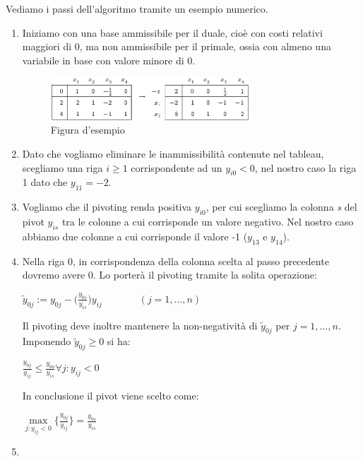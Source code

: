 \documentclass[11pt]{book}
\begin{document}
Vediamo i passi dell'algoritmo tramite un esempio numerico.

\begin{enumerate}
\item Iniziamo con una base ammissibile per il duale, cio\`e con costi
  relativi maggiori di 0, ma non ammissibile per il primale, ossia con
  almeno una variabile in base con valore minore di 0.

\begin{figure}[h!]
  \centering
  \includegraphics[width=0.7\textwidth]{images/cap5tab3.png}
  \caption{Figura d'esempio}
  \label{cap5tab3}
\end{figure}

\item Dato che vogliamo eliminare le inammissibilit\`a contenute nel
  tableau, scegliamo una riga $i \geq 1$ corrispondente ad un $y_{i0}
  < 0$, nel nostro caso la riga 1 dato che $y_{11} = -2$. 

\item Vogliamo che il pivoting renda positiva $y_{i0}$, per cui
  scegliamo la colonna {\em s} del pivot $y_{is}$ tra le colonne a cui
  corrisponde un valore negativo. Nel nostro caso abbiamo due colonne
  a cui corrisponde il valore -1 ($y_{13}$ e $y_{14}$).

\item Nella riga 0, in corrispondenza della colonna scelta al passo
  precedente dovremo avere 0. Lo porter\`a il pivoting tramite
  la solita operazione:

  \begin{center}
    $\tilde{y}_{0j} := y_{0j} -
    \bigr(\frac{y_{0s}}{y_{is}}\bigr)y_{ij}\phantom{aaaaaaa}(j=1,\dots,n)$
  \end{center}

  Il pivoting deve inoltre mantenere la non-negativit\`a di
  $\tilde{y}_{0j}$ per $j=1,\dots,n$. Imponendo $\tilde{y}_{0j} \geq
  0$ si ha:

  \begin{center}
    $\frac{y_{0j}}{y_{ij}} \leq \frac{y_{0o}}{y_{is}} \forall j :
    y_{ij}<0$
  \end{center}

  In conclusione il pivot viene scelto come:

  \begin{center}
    $\max\limits_{j:y_{ij}<0}\bigr\{\frac{y_{0j}}{y_{ij}}\bigr\} = \frac{y_{0s}}{y_{is}}$
  \end{center}


\item 

\end{enumerate}
\end{document}

